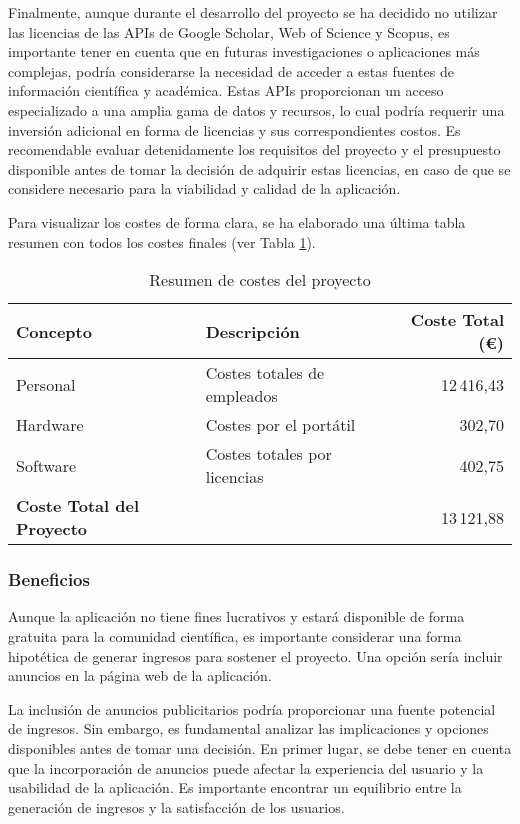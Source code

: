 \begin{enumerate}
    Finalmente, aunque durante el desarrollo del proyecto se ha decidido no utilizar las licencias de las APIs de Google Scholar, Web of Science y Scopus, es importante tener en cuenta que en futuras investigaciones o aplicaciones más complejas, podría considerarse la necesidad de acceder a estas fuentes de información científica y académica. Estas APIs proporcionan un acceso especializado a una amplia gama de datos y recursos, lo cual podría requerir una inversión adicional en forma de licencias y sus correspondientes costos. Es recomendable evaluar detenidamente los requisitos del proyecto y el presupuesto disponible antes de tomar la decisión de adquirir estas licencias, en caso de que se considere necesario para la viabilidad y calidad de la aplicación.
\end{enumerate}

Para visualizar los costes de forma clara, se ha elaborado una última tabla resumen con todos los costes finales (ver Tabla \ref{tab:costes-totales}).

\begin{table}[h]
\centering
\begin{tabularx}{\textwidth}{@{}lXr@{}}
\toprule
\textbf{Concepto} & \textbf{Descripción} & \textbf{Coste Total (€)} \\
\midrule
Personal & Costes totales de empleados & 12\,416,43 \\
Hardware & Costes por el portátil & 302,70 \\
Software & Costes totales por licencias & 402,75 \\
\midrule
\textbf{Coste Total del Proyecto} & & 13\,121,88 \\
\bottomrule
\end{tabularx}
\caption{Resumen de costes del proyecto}
\label{tab:costes-totales}
\end{table}


\subsubsection{Beneficios}
Aunque la aplicación no tiene fines lucrativos y estará disponible de forma gratuita para la comunidad científica, es importante considerar una forma hipotética de generar ingresos para sostener el proyecto. Una opción sería incluir anuncios en la página web de la aplicación. 

La inclusión de anuncios publicitarios podría proporcionar una fuente potencial de ingresos. Sin embargo, es fundamental analizar las implicaciones y opciones disponibles antes de tomar una decisión. En primer lugar, se debe tener en cuenta que la incorporación de anuncios puede afectar la experiencia del usuario y la usabilidad de la aplicación. Es importante encontrar un equilibrio entre la generación de ingresos y la satisfacción de los usuarios.

